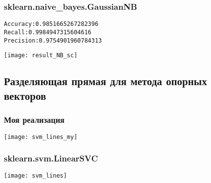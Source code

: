 \subsubsection{sklearn.naive\_bayes.GaussianNB}
\begin{alltt}
Accuracy: 0.9851665267282396
Recall: 0.9984947315604616
Precision: 0.9754901960784313
\end{alltt}
\begin{center}
\texttt{[image: result\_NB\_sc]}
\end{center}
\pagebreak

\subsection{Разделяющая прямая для метода опорных векторов}
\subsubsection{Моя реализация}
\begin{center}
\texttt{[image: svm\_lines\_my]}
\end{center}
\pagebreak

\subsubsection{sklearn.svm.LinearSVC}
\begin{center}
\texttt{[image: svm\_lines]}
\end{center}

\pagebreak
